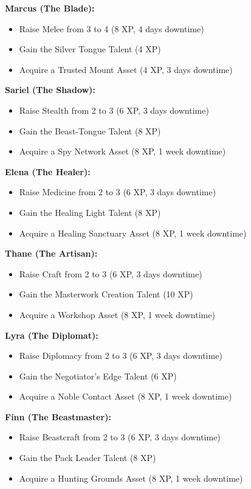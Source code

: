 \documentclass[11pt]{article}
\begin{document}
\textbf{Marcus (The Blade):}
\begin{itemize}
\item Raise Melee from 3 to 4 (8 XP, 4 days downtime)
\item Gain the Silver Tongue Talent (4 XP)
\item Acquire a Trusted Mount Asset (4 XP, 3 days downtime)
\end{itemize}

\textbf{Sariel (The Shadow):}
\begin{itemize}
\item Raise Stealth from 2 to 3 (6 XP, 3 days downtime)
\item Gain the Beast-Tongue Talent (8 XP)
\item Acquire a Spy Network Asset (8 XP, 1 week downtime)
\end{itemize}

\textbf{Elena (The Healer):}
\begin{itemize}
\item Raise Medicine from 2 to 3 (6 XP, 3 days downtime)
\item Gain the Healing Light Talent (8 XP)
\item Acquire a Healing Sanctuary Asset (8 XP, 1 week downtime)
\end{itemize}

\textbf{Thane (The Artisan):}
\begin{itemize}
\item Raise Craft from 2 to 3 (6 XP, 3 days downtime)
\item Gain the Masterwork Creation Talent (10 XP)
\item Acquire a Workshop Asset (8 XP, 1 week downtime)
\end{itemize}

\textbf{Lyra (The Diplomat):}
\begin{itemize}
\item Raise Diplomacy from 2 to 3 (6 XP, 3 days downtime)
\item Gain the Negotiator's Edge Talent (6 XP)
\item Acquire a Noble Contact Asset (8 XP, 1 week downtime)
\end{itemize}

\textbf{Finn (The Beastmaster):}
\begin{itemize}
\item Raise Beastcraft from 2 to 3 (6 XP, 3 days downtime)
\item Gain the Pack Leader Talent (8 XP)
\item Acquire a Hunting Grounds Asset (8 XP, 1 week downtime)
\end{itemize}
\end{document}
